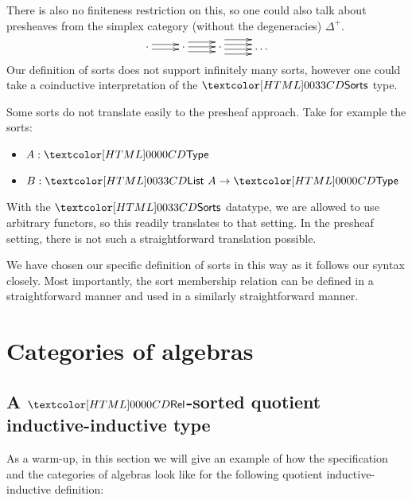 There is also no finiteness restriction on this, so one could also
talk about presheaves from the simplex category (without the
degeneracies) $\Delta^+$.
$$
\xymatrix{
\cdot     
\ar@<-.5ex>[r]
\ar@<.5ex>[r]
&\cdot
\ar@<-1ex>[r]
\ar@<0ex>[r]
\ar@<1ex>[r]
&\cdot
\ar@<-1.5ex>[r]
\ar@<-.5ex>[r]
\ar@<.5ex>[r]
\ar@<1.5ex>[r]
&\hdots
}
$$
Our definition of sorts does not support infinitely many sorts,
however one could take a coinductive interpretation of the $\sortsty$
type.

Some sorts do not translate easily to the presheaf approach. Take for
example the sorts:
\begin{itemize}
\item $A : \Type$
\item $B : \List\ A \to \Type$
\end{itemize}
With the $\sortsty$ datatype, we are allowed to use arbitrary
functors, so this readily translates to that setting. In the presheaf
setting, there is not such a straightforward translation possible.

We have chosen our specific definition of sorts in this way as it
follows our syntax closely. Most importantly, the sort membership
relation can be defined in a straightforward manner and used in a
similarly straightforward manner.


\section{Categories of algebras}

\subsection{A $\Rel$-sorted quotient inductive-inductive type}

As a warm-up, in this section we will give an example of how the
specification and the categories of algebras look like for the
following quotient inductive-inductive definition:
%
\begin{sorts}
  \sortnamety{\Aty}{\Set} \\
  \sortnamety{\Bty}{\Aty \to \Aty \to \Set}
\end{sorts}
%
\begin{datatype}{\Aty}{}
  \constr{\Aco}{\Aty} \\
  \constr{\Aci}{\Aty}
\end{datatype}
%
\begin{datatype}{\Bty}{}
  \constr{\Bcii}{\natty \to \Bty\ \Aco\ \Aci} \\
\end{datatype}

